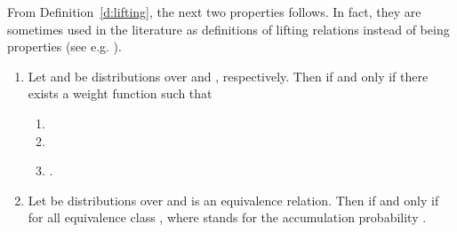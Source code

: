 \documentclass{article}
\begin{document}
From Definition~\ref{d:lifting}, the next two properties follows. In
fact, they are sometimes used in the literature as definitions of
lifting relations instead of being properties (see e.g.
\cite{SL94,LS91}).
\begin{theorem}\label{t:lifting.alternative}
\begin{enumerate}
\item Let  and  be distributions over  and ,
  respectively. Then
   if and only if there
  exists a weight function  such that
  \begin{enumerate}
  \item 
  \item 
  \item .
  \end{enumerate}
\item Let  be distributions over   and
  is an equivalence relation. Then
 if and only if 
for all equivalence class , where 
stands for the accumulation probability .
\end{enumerate}
\end{theorem}
\end{document}

